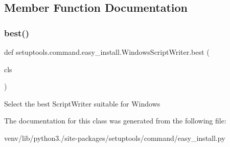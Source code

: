 \subsection{Member Function Documentation}
\mbox{\label{classsetuptools_1_1command_1_1easy__install_1_1_windows_script_writer_a0e902494038a088017e95fdfe07b76f1}} 
\subsubsection{\texorpdfstring{best()}{best()}}
{\footnotesize\ttfamily def setuptools.\+command.\+easy\+\_\+install.\+Windows\+Script\+Writer.\+best (\begin{DoxyParamCaption}\item[{}]{cls }\end{DoxyParamCaption})}

\begin{DoxyVerb}Select the best ScriptWriter suitable for Windows
\end{DoxyVerb}
 

The documentation for this class was generated from the following file\+:\begin{DoxyCompactItemize}
\item 
venv/lib/python3./site-\/packages/setuptools/command/easy\+\_\+install.\+py\end{DoxyCompactItemize}
